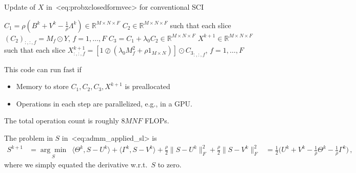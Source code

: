 \documentclass[a4paper,11pt]{article}
\def\\{}%
\def\eqref#1{<#1>}%
\newcommand{\mypar}[1]{\bigskip\noindent {\bf #1.}}
\begin{document}
\begin{algorithm}
  \caption{Update of $X$ in~\eqref{eq:probxclosedformvec} for
  conventional SCI}
  \label{alg:updateX}
  \begin{algorithmic}[1]
    \State $C_1 = \rho (B^k + V^k - \frac{1}{\rho}\Lambda^k) \in \mathbb{R}^{M\times N\times F}$
    \State $C_2 \in \mathbb{R}^{M\times N\times F}$ such that each slice
    $(C_2)_{:, :, f} = M_f \odot Y$, $f = 1, \ldots, F$
    \State $C_3 = C_1 + \lambda_0 C_2 \in \mathbb{R}^{M \times N\times F}$
    \State $X^{k+1} \in \mathbb{R}^{M\times N\times F}$ such that each slice
    $X^{k+1}_{:, :, f} = \left[1\oslash(\lambda_0 M_f^2 + \rho 1_{M\times N})\right]
    \odot {C_3}_{:, :, f}$,
    $f=1, \ldots, F$
    \label{subAlg:lastStep}
  \end{algorithmic}
\end{algorithm}
This code can run fast if
\begin{itemize}
  \item Memory to store $C_1, C_2, C_3, X^{k+1}$ is preallocated

  \item Operations in each step are parallelized, e.g., in a GPU.
\end{itemize}
The total operation count is roughly $8MNF$ FLOPs.

\mypar{Updating $\bm{S}$}
The problem in $S$ in~\eqref{eq:admm_applied_sl} is
\begin{align*}
  S^{k+1} 
  &=
  \underset{S}{\arg\min} \,\,\,
  \langle\Theta^k, S - U^k\rangle
  +
  \langle\Gamma^k, S - V^k\rangle
  +
  \frac{\rho}{2}
  \|S - U^k\|_{F}^2
  +
  \frac{\rho}{2}
  \|S - V^k\|_{F}^2
  \\ 
  &=
  \frac{1}{2}
  \Big(U^k + V^k - \frac{1}{\rho}\Theta^k - \frac{1}{\rho}\Gamma^k\Big)\,,
\end{align*}
where we simply equated the derivative w.r.t.\ $S$ to zero. 
\end{document}
